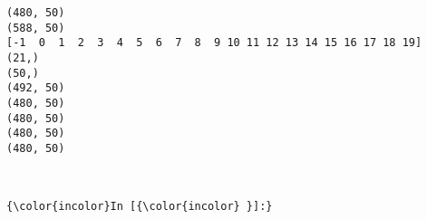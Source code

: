 \documentclass[11pt]{article}
\begin{document}
    \begin{Verbatim}[commandchars=\\\{\}]
(480, 50)
(588, 50)
[-1  0  1  2  3  4  5  6  7  8  9 10 11 12 13 14 15 16 17 18 19]
(21,)
(50,)
(492, 50)
(480, 50)
(480, 50)
(480, 50)
(480, 50)

    \end{Verbatim}

    \begin{center}
    \end{center}
    { \hspace*{\fill} \\}
    
    \begin{Verbatim}[commandchars=\\\{\}]
{\color{incolor}In [{\color{incolor} }]:} 
\end{Verbatim}
\end{document}
